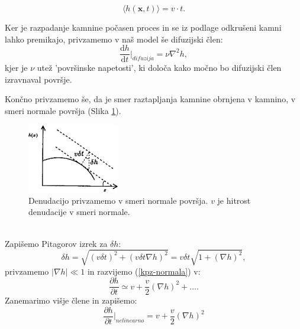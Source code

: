 \documentclass[a4paper, twoside, 12pt]{book}
\begin{document}
\begin{equation}
  \langle h(\mathbf{x},t) \rangle = v \cdot t.
\end{equation}

Ker je razpadanje kamnine počasen proces in se iz podlage odkrušeni kamni lahko premikajo, privzamemo v naš model še difuzijski člen:
\begin{equation}
  \frac{\mathrm{d} h}{\mathrm{d} t} \bigg|_{difuzija} = \nu \nabla^2 h,
\end{equation}
kjer je $\nu$ utež 'površinske napetosti', ki določa kako močno bo difuzijski člen izravnaval površje.

Končno privzamemo še, da je smer raztapljanja kamnine obrnjena v kamnino, v smeri normale površja (Slika \ref{fig:KPZ}). 
\begin{figure}[h!]
  \begin{center}
    \includegraphics[width=4cm]{slike/KPZ.jpg}
  \end{center}
  \caption{Denudacijo privzamemo v smeri normale površja. $v$ je hitrost denudacije v smeri normale.}
  \label{fig:KPZ}
\end{figure}
\\ Zapišemo Pitagorov izrek za $\delta h$:
\begin{equation}
  \delta h = \sqrt{(v \delta t)^2 + (v \delta t \nabla h)^2} = v \delta t \sqrt{1 + (\nabla h)^2},
  \label{kpz-normala}
\end{equation}
privzamemo $|\nabla h| \ll 1$ in razvijemo (\ref{kpz-normala}) v:
\begin{equation}
  \frac{\partial h}{\partial t} \simeq v + \frac{v}{2} (\nabla h)^2 + \dots.
\end{equation}
Zanemarimo višje člene in zapišemo:
\begin{equation}
  \frac{\partial h}{\partial t} \bigg|_{nelinearno} = v + \frac{v}{2} (\nabla h)^2
\end{equation}
\end{document}
